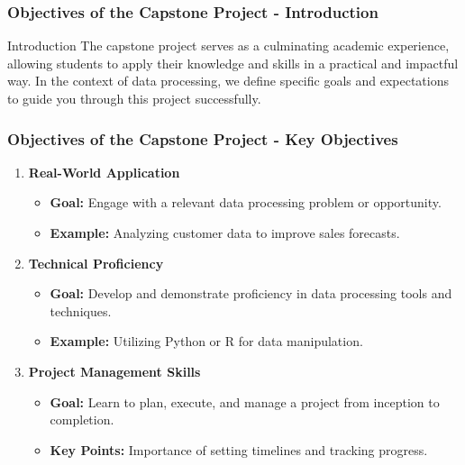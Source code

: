\documentclass[aspectratio=169]{beamer}
\begin{document}
\begin{frame}[fragile]
    \frametitle{Objectives of the Capstone Project - Introduction}
    \begin{block}{Introduction}
        The capstone project serves as a culminating academic experience, allowing students to apply their knowledge and skills in a practical and impactful way. 
        In the context of data processing, we define specific goals and expectations to guide you through this project successfully.
    \end{block}
\end{frame}

\begin{frame}[fragile]
    \frametitle{Objectives of the Capstone Project - Key Objectives}
    \begin{enumerate}
        \item \textbf{Real-World Application}
        \begin{itemize}
            \item \textbf{Goal:} Engage with a relevant data processing problem or opportunity.
            \item \textbf{Example:} Analyzing customer data to improve sales forecasts.
        \end{itemize}
        
        \item \textbf{Technical Proficiency}
        \begin{itemize}
            \item \textbf{Goal:} Develop and demonstrate proficiency in data processing tools and techniques.
            \item \textbf{Example:} Utilizing Python or R for data manipulation.
        \end{itemize}
        
        \item \textbf{Project Management Skills}
        \begin{itemize}
            \item \textbf{Goal:} Learn to plan, execute, and manage a project from inception to completion.
            \item \textbf{Key Points:} Importance of setting timelines and tracking progress.
        \end{itemize}
    \end{enumerate}
\end{frame}
\end{document}
